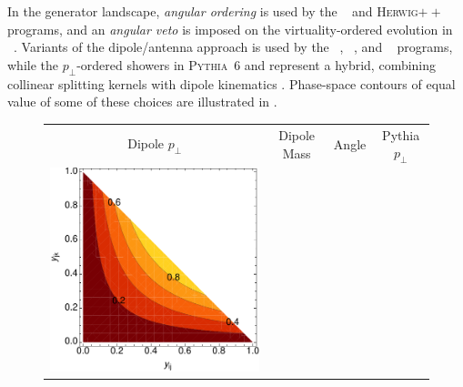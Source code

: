 In the generator landscape, \emph{angular ordering} is used by the 
\Hw~\cite{Marchesini:1987cf}
and \textsc{Herwig$++$}~\cite{Gieseke:2003rz} programs,  and an \emph{angular
veto} is imposed on the virtuality-ordered evolution
in ~\cite{Bengtsson:1986et}.
Variants of the dipole/antenna approach is used 
by the \Ar~\cite{Lonnblad:1992tz}, \Sh~\cite{Nagy:2005aa,Schumann:2007mg},
and \Vc~\cite{Fischer:2016vfv} programs,
while the $p_\perp$-ordered showers in \textsc{Pythia~6} and  
represent a
hybrid, combining collinear splitting kernels with dipole
kinematics \cite{Sjostrand:2004ef}. Phase-space 
contours of equal value of some of
these choices are illustrated in . 
\begin{figure}[t]
\centering
\small
\begin{tabular}{cccc}
Dipole $p_\perp$ & Dipole Mass & Angle & Pythia $p_\perp$\\
\includegraphics[scale=0.375]{ev1sq} &

\end{tabular}
\end{figure}
